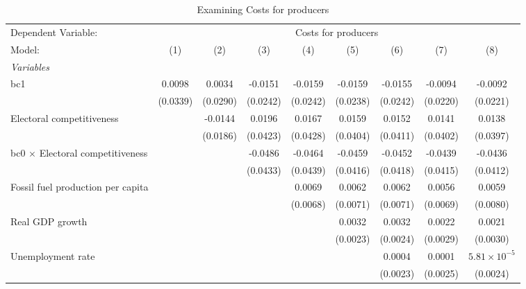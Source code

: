 
\begin{table}[htbp]
   \caption{Examining Costs for producers}
   \centering
   \begin{tabular}{lcccccccc}
      \tabularnewline \midrule \midrule
      Dependent Variable: & \multicolumn{8}{c}{Costs for producers}\\
      Model:                                  & (1)      & (2)      & (3)      & (4)      & (5)      & (6)      & (7)      & (8)\\  
      \midrule
      \emph{Variables}\\
      bc1                                     & 0.0098   & 0.0034   & -0.0151  & -0.0159  & -0.0159  & -0.0155  & -0.0094  & -0.0092\\   
                                              & (0.0339) & (0.0290) & (0.0242) & (0.0242) & (0.0238) & (0.0242) & (0.0220) & (0.0221)\\   
      Electoral competitiveness               &          & -0.0144  & 0.0196   & 0.0167   & 0.0159   & 0.0152   & 0.0141   & 0.0138\\   
                                              &          & (0.0186) & (0.0423) & (0.0428) & (0.0404) & (0.0411) & (0.0402) & (0.0397)\\   
      bc0 $\times$ Electoral competitiveness  &          &          & -0.0486  & -0.0464  & -0.0459  & -0.0452  & -0.0439  & -0.0436\\   
                                              &          &          & (0.0433) & (0.0439) & (0.0416) & (0.0418) & (0.0415) & (0.0412)\\   
      Fossil fuel production per capita       &          &          &          & 0.0069   & 0.0062   & 0.0062   & 0.0056   & 0.0059\\   
                                              &          &          &          & (0.0068) & (0.0071) & (0.0071) & (0.0069) & (0.0080)\\   
      Real GDP growth                         &          &          &          &          & 0.0032   & 0.0032   & 0.0022   & 0.0021\\   
                                              &          &          &          &          & (0.0023) & (0.0024) & (0.0029) & (0.0030)\\   
      Unemployment rate                       &          &          &          &          &          & 0.0004   & 0.0001   & $5.81\times 10^{-5}$\\    
                                              &          &          &          &          &          & (0.0023) & (0.0025) & (0.0024)\\   

\end{tabular}
\end{table}
